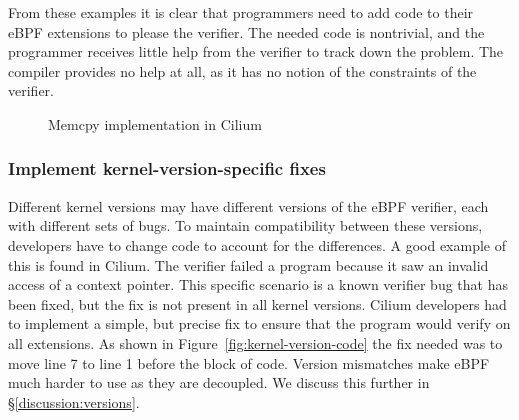 From these examples it is clear that programmers need to add code to their
    eBPF extensions to please the verifier.
The needed code is nontrivial, and the programmer receives little help from the verifier to track down
    the problem.
The compiler provides no help at all, as it has no notion of the constraints of the verifier.

\begin{figure}
    
    \caption{Memcpy implementation in Cilium}
    \label{fig:cilium-memcpy}
\end{figure}

\subsubsection{Implement kernel-version-specific fixes}
\label{motivation:kernel-version}
Different kernel versions may have different versions of the eBPF verifier, each with different sets of bugs.
To maintain compatibility between these versions, developers have to change code to account for the differences.
A good example of this is found in Cilium.
The verifier failed a program because it saw an invalid access of a context pointer.
This specific scenario is a known verifier bug that has been fixed, but the fix is not present in all kernel versions.
Cilium developers had to implement a simple, but precise fix to ensure that the program would verify on all extensions.
As shown in Figure~\ref{fig:kernel-version-code} the fix needed was to move line 7 to line 1 before the block of code.
Version mismatches make eBPF much harder to use as they are decoupled.
We discuss this further in \S\ref{discussion:versions}.


